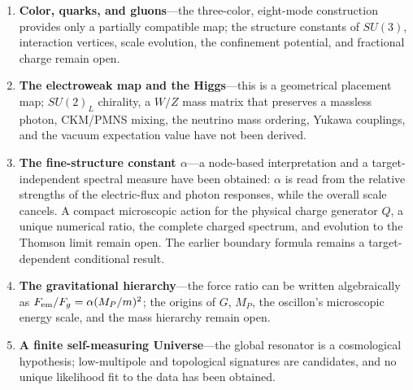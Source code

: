 \documentclass[11pt,a4paper]{article}
\begin{document}
\begin{enumerate}
\item \textbf{Color, quarks, and gluons}---the three-color, eight-mode construction provides only a partially compatible map; the structure constants of $SU(3)$, interaction vertices, scale evolution, the confinement potential, and fractional charge remain open.

\item \textbf{The electroweak map and the Higgs}---this is a geometrical placement map; $SU(2)_L$ chirality, a $W/Z$ mass matrix that preserves a massless photon, CKM/PMNS mixing, the neutrino mass ordering, Yukawa couplings, and the vacuum expectation value have not been derived.

\item \textbf{The fine-structure constant $\alpha$}---a node-based interpretation and a target-independent spectral measure have been obtained: $\alpha$ is read from the relative strengths of the electric-flux and photon responses, while the overall scale cancels. A compact microscopic action for the physical charge generator $Q$, a unique numerical ratio, the complete charged spectrum, and evolution to the Thomson limit remain open. The earlier boundary formula remains a target-dependent conditional result.

\item \textbf{The gravitational hierarchy}---the force ratio can be written algebraically as $F_{\rm em}/F_g=\alpha(M_P/m)^2$; the origins of $G$, $M_P$, the oscillon's microscopic energy scale, and the mass hierarchy remain open.

\item \textbf{A finite self-measuring Universe}---the global resonator is a cosmological hypothesis; low-multipole and topological signatures are candidates, and no unique likelihood fit to the data has been obtained.
\end{enumerate}

{}


\end{document}
